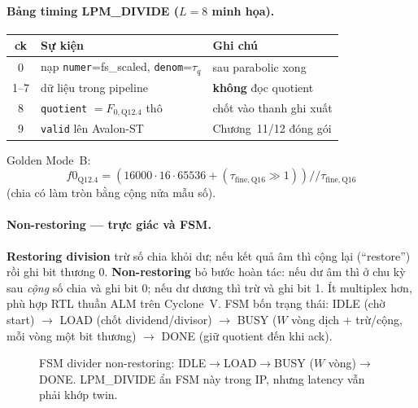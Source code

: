 \paragraph{Bảng timing LPM\_DIVIDE ($L=8$ minh họa).}
\begin{center}\small
\begin{tabular}{@{}cll@{}}\toprule
ck & Sự kiện & Ghi chú \\
\midrule
0 & nạp \texttt{numer}=fs\_scaled, \texttt{denom}=$\tau_q$ & sau parabolic xong \\
1--7 & dữ liệu trong pipeline & \textbf{không} đọc quotient \\
8 & \texttt{quotient} $= F_{0,\mathrm{Q12.4}}$ thô & chốt vào thanh ghi xuất \\
9 & \texttt{valid} lên Avalon-ST & Chương~11/12 đóng gói \\
\bottomrule
\end{tabular}
\end{center}
Golden Mode~B:
\[
f0_{\mathrm{Q12.4}} = (16000\cdot 16\cdot 65536 + (\tau_{\mathrm{fine,Q16}}\gg 1)) // \tau_{\mathrm{fine,Q16}}
\]
(chia có làm tròn bằng cộng nửa mẫu số).

\paragraph{Non-restoring --- trực giác và FSM.}
\textbf{Restoring division} trừ số chia khỏi dư; nếu kết quả âm thì cộng lại (``restore'') rồi ghi bit thương 0. \textbf{Non-restoring} bỏ bước hoàn tác: nếu dư âm thì ở chu kỳ sau \emph{cộng} số chia và ghi bit 0; nếu dư dương thì trừ và ghi bit 1. Ít multiplex hơn, phù hợp RTL thuần ALM trên Cyclone~V. FSM bốn trạng thái: IDLE (chờ start) $\to$ LOAD (chốt dividend/divisor) $\to$ BUSY ($W$ vòng dịch + trừ/cộng, mỗi vòng một bit thương) $\to$ DONE (giữ quotient đến khi ack).

\begin{figure}[H]
\centering
{}
\caption{FSM divider non-restoring: IDLE$\to$LOAD$\to$BUSY ($W$ vòng)$\to$DONE. LPM\_DIVIDE ẩn FSM này trong IP, nhưng latency vẫn phải khớp twin.}
\label{fig:ch09_div_fsm}
\end{figure}

